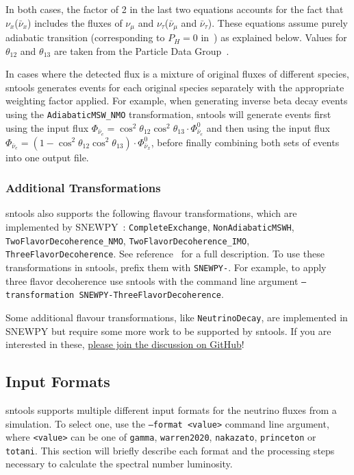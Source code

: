 \documentclass[11pt, oneside]{article}
\newcommand{\numu}{\ensuremath{\nu_\mu}\xspace}
\newcommand{\nutau}{\ensuremath{\nu_\tau}\xspace}
\newcommand{\nux}{\ensuremath{\nu_x}\xspace}
\newcommand{\nuebar}{\ensuremath{\bar{\nu}_e}\xspace}
\newcommand{\numubar}{\ensuremath{\bar{\nu}_\mu}\xspace}
\newcommand{\nutaubar}{\ensuremath{\bar{\nu}_\tau}\xspace}
\newcommand{\nuxbar}{\ensuremath{\bar{\nu}_x}\xspace}
\begin{document}
In both cases, the factor of 2 in the last two equations accounts for the fact that \nux (\nuxbar) includes the fluxes of \numu and \nutau (\numubar and \nutaubar).
These equations assume purely adiabatic transition (corresponding to $P_H = 0$ in~\cite{Dighe2000,Fogli2005}) as explained below.
Values for $\theta_{12}$ and $\theta_{13}$ are taken from the Particle Data Group~\cite{PDG2020}.

In cases where the detected flux is a mixture of original fluxes of different species, sntools generates events for each original species separately with the appropriate weighting factor applied.
For example, when generating inverse beta decay events using the \texttt{AdiabaticMSW\_NMO} transformation, sntools will generate events first using the input flux $\Phi_{\nuebar} = \cos^2 \theta_{12} \cos^2 \theta_{13} \cdot \Phi^0_{\nuebar}$ and then using the input flux $\Phi_{\nuebar} = (1 - \cos^2 \theta_{12} \cos^2 \theta_{13}) \cdot \Phi^0_{\nuxbar}$, before finally combining both sets of events into one output file.

\subsubsection{Additional Transformations}
sntools also supports the following flavour transformations, which are implemented by SNEWPY~\cite{Baxter2021}:
\texttt{CompleteExchange},
\texttt{NonAdiabaticMSWH},
\texttt{TwoFlavorDecoherence\_NMO},
\texttt{TwoFlavorDecoherence\_IMO},
\texttt{ThreeFlavorDecoherence}.
See reference~\cite{SNEWS:2021ezc} for a full description.
To use these transformations in sntools, prefix them with \texttt{SNEWPY-}. For example, to apply three flavor decoherence use sntools with the command line argument \texttt{--transformation SNEWPY-ThreeFlavorDecoherence}.

Some additional flavour transformations, like \texttt{NeutrinoDecay}, are implemented in SNEWPY but require some more work to be supported by sntools. If you are interested in these, \href{https://github.com/SNEWS2/sntools/issues/28}{please join the discussion on GitHub}!


\subsection{Input Formats} \label{sec:input-formats}
sntools supports multiple different input formats for the neutrino fluxes from a simulation.
To select one, use the \texttt{--format <value>} command line argument, where \texttt{<value>} can be one of \texttt{gamma}, \texttt{warren2020}, \texttt{nakazato}, \texttt{princeton} or \texttt{totani}.
This section will briefly describe each format and the processing steps necessary to calculate the spectral number luminosity.
\end{document}

